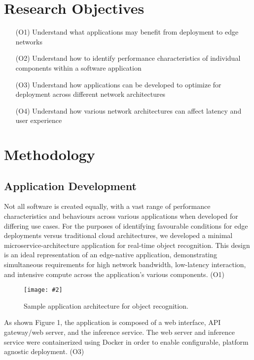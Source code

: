 \documentclass[11pt]{article}
\newcommand{\capfigure}[3][0.5] {
    \begin{figure}[H]
    \centering
    \texttt{[image: \#2]}
    \caption{#3}
    \end{figure}
}
\begin{document}
\newpage
\section{Research Objectives}
\begin{itemize}
    \item [(O1)] {
        Understand what applications may benefit from deployment to edge networks
        }
    \item [(O2)] {
        Understand how to identify performance characteristics of individual components within
        a software application
        }
    \item [(O3)] {
        Understand how applications can be developed to optimize for deployment across different 
        network architectures
        }
    \item [(O4)] {
        Understand how various network architectures can affect latency and user experience
        }
\end{itemize}

\newpage
\section{Methodology}
\subsection{Application Development}
Not all software is created equally, with a vast range of performance characteristics and
behaviours across various applications when developed for differing use cases. For the purposes
of identifying favourable conditions for edge deployments versus traditional cloud architectures, 
we developed a minimal microservice-architecture application for real-time object recognition. 
This design is an ideal representation of an edge-native application, demonstrating simultaneous 
requirements for high network bandwidth, low-latency interaction, and intensive compute across 
the application's various components. (O1)\newline

\capfigure[0.75]{images/applicationdesign1}{Sample application architecture for object recognition.}

As shown Figure 1, the application is composed of a web interface, API gateway/web server, 
and the inference service. The web server and inference service were containerized using Docker 
in order to enable configurable, platform agnostic deployment. (O3)\newline
\end{document}
